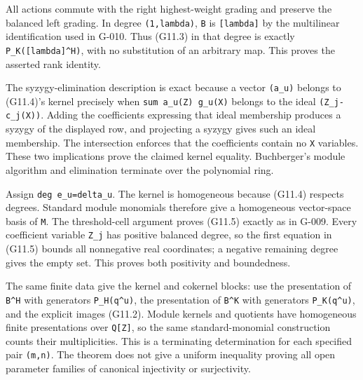 \documentclass[
  10pt,
]{article}
\begin{document}
All actions commute with the right highest-weight grading and preserve
the balanced left grading. In degree
\texttt{\small (\allowbreak{}1,\allowbreak{}lambda)\allowbreak{}},
\texttt{\small B} is \texttt{\small [\allowbreak{}lambda]\allowbreak{}}
by the multilinear identification used in G-010. Thus (G11.3) in that
degree is exactly
\texttt{\small P\_\allowbreak{}K(\allowbreak{}[\allowbreak{}lambda]\allowbreak{}\textasciicircum{}H)\allowbreak{}},
with no substitution of an arbitrary map. This proves the asserted rank
identity.

The syzygy-elimination description is exact because a vector
\texttt{\small (\allowbreak{}a\_\allowbreak{}u)\allowbreak{}} belongs to
(G11.4)'s kernel precisely when
\texttt{\small sum a\_\allowbreak{}u(\allowbreak{}Z)\allowbreak{} g\_\allowbreak{}u(\allowbreak{}X)\allowbreak{}}
belongs to the ideal
\texttt{\small (\allowbreak{}Z\_\allowbreak{}j-\allowbreak{}c\_\allowbreak{}j(\allowbreak{}X)\allowbreak{})\allowbreak{}}.
Adding the coefficients expressing that ideal membership produces a
syzygy of the displayed row, and projecting a syzygy gives such an ideal
membership. The intersection enforces that the coefficients contain no
\texttt{\small X} variables. These two implications prove the claimed
kernel equality. Buchberger's module algorithm and elimination terminate
over the polynomial ring.

Assign
\texttt{\small deg e\_\allowbreak{}u=\allowbreak{}delta\_\allowbreak{}u}.
The kernel is homogeneous because (G11.4) respects degrees. Standard
module monomials therefore give a homogeneous vector-space basis of
\texttt{\small M}. The threshold-cell argument proves (G11.5) exactly as
in G-009. Every coefficient variable \texttt{\small Z\_\allowbreak{}j}
has positive balanced degree, so the first equation in (G11.5) bounds
all nonnegative real coordinates; a negative remaining degree gives the
empty set. This proves both positivity and boundedness.

The same finite data give the kernel and cokernel blocks: use the
presentation of \texttt{\small B\textasciicircum{}H} with generators
\texttt{\small P\_\allowbreak{}H(\allowbreak{}q\textasciicircum{}u)\allowbreak{}},
the presentation of \texttt{\small B\textasciicircum{}K} with generators
\texttt{\small P\_\allowbreak{}K(\allowbreak{}q\textasciicircum{}u)\allowbreak{}},
and the explicit images (G11.2). Module kernels and quotients have
homogeneous finite presentations over
\texttt{\small Q[\allowbreak{}Z]\allowbreak{}}, so the same
standard-monomial construction counts their multiplicities. This is a
terminating determination for each specified pair
\texttt{\small (\allowbreak{}m,\allowbreak{}n)\allowbreak{}}. The
theorem does not give a uniform inequality proving all open parameter
families of canonical injectivity or surjectivity.
\end{document}
